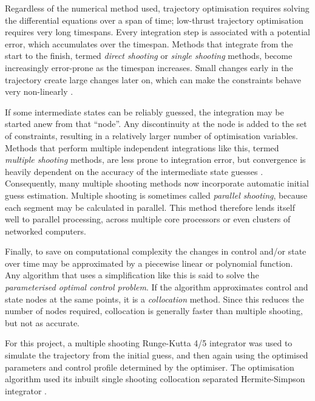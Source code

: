 
Regardless of the numerical method used, trajectory optimisation requires solving the differential equations over a span of time; low-thrust trajectory optimisation requires very long timespans. Every integration step is associated with a potential error, which accumulates over the timespan. Methods that integrate from the start to the finish, termed \emph{direct shooting} or \emph{single shooting} methods, become increasingly error-prone as the timespan increases. Small changes early in the trajectory create large changes later on, which can make the constraints behave very non-linearly \parencite{Betts1998}. 

If some intermediate states can be reliably guessed, the integration may be started anew from that \enquote{node}. Any discontinuity at the node is added to the set of constraints, resulting in a relatively larger number of optimisation variables. Methods that perform multiple independent integrations like this, termed \emph{multiple shooting} methods, are less prone to integration error, but convergence is heavily dependent on the accuracy of the intermediate state guesses \parencite{Betts1998, ASTOS_guide}. Consequently, many multiple shooting methods now incorporate automatic initial guess estimation. Multiple shooting is sometimes called \emph{parallel shooting}, because each segment may be calculated in parallel. This method therefore lends itself well to parallel processing, across multiple core processors or even clusters of networked computers. 

Finally, to save on computational complexity the changes in control and/or state over time may be approximated by a piecewise linear or polynomial function. Any algorithm that uses a simplification like this is said to solve the \emph{parameterised optimal control problem}. If the algorithm approximates control and state nodes at the same points, it is a \emph{collocation} method. Since this reduces the number of nodes required, collocation is generally faster than multiple shooting, but not as accurate.%

For this project, a multiple shooting Runge-Kutta 4/5 integrator was used to simulate the trajectory from the initial guess, and then again using the optimised parameters and control profile determined by the optimiser. The optimisation algorithm used its inbuilt single shooting collocation separated Hermite-Simpson integrator \parencite{Betts2010}.

